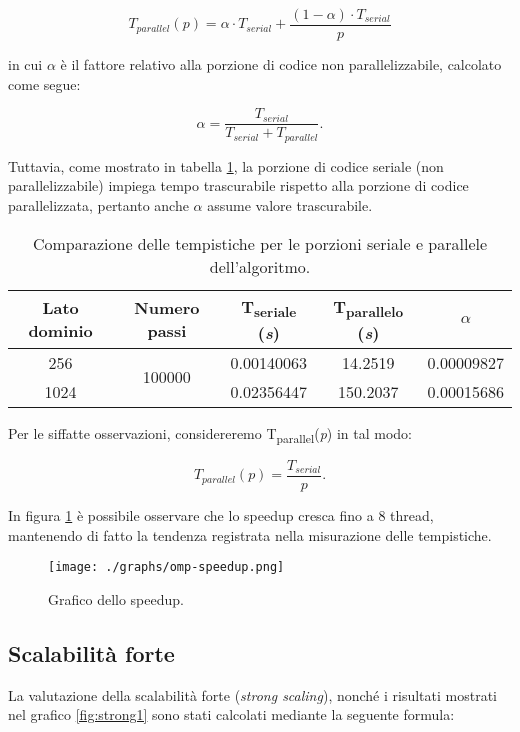\[ 
T_{parallel}(p) = \alpha \cdot T_{serial} +  \frac{(1 - \alpha) \cdot
T_{serial}}{p}
\]

in cui $\alpha$ è il fattore relativo alla porzione di codice non
parallelizzabile, calcolato come segue:

\[ 
\alpha = \frac{T_{serial}}{T_{serial} + T_{parallel}}.
\]

Tuttavia, come mostrato in tabella \ref{tab:alpha}, la porzione di codice
seriale (non parallelizzabile) impiega tempo trascurabile rispetto alla porzione
di codice parallelizzata, pertanto anche $\alpha$ assume valore trascurabile.

\begin{table}[ht]
\centering
\begin{tabular}{ccccc}
\toprule
 Lato dominio & Numero passi & T\textsubscript{seriale} (\textit{s}) &
 T\textsubscript{parallelo} (\textit{s})& $\alpha$ \\
 \midrule
    256 & \multirow{2}{*}{100000} & 0.00140063 & 14.2519 & 0.00009827 \\
    1024 & & 0.02356447 & 150.2037 & 0.00015686 \\
\bottomrule
\end{tabular}
\caption{Comparazione delle tempistiche per le porzioni seriale e parallele
dell'algoritmo.\label{tab:alpha}}
\end{table}

Per le siffatte osservazioni, considereremo
T\textsubscript{parallel}(\textit{p}) in tal modo:

\[
T_{parallel}(p) = \frac{T_{serial}}{p}.
\]

In figura \ref{fig:speedup1} è possibile osservare che lo speedup cresca fino a
8 thread, mantenendo di fatto la tendenza registrata nella misurazione delle
tempistiche.

\begin{figure}[!ht]
  \centering
  \texttt{[image: ./graphs/omp-speedup.png]}
  \caption{Grafico dello speedup.}\label{fig:speedup1}
\end{figure}

\subsection{Scalabilità forte}

La valutazione della scalabilità forte (\textit{strong scaling}), nonché i
risultati mostrati nel grafico \ref{fig:strong1} sono stati calcolati mediante
la seguente formula:

